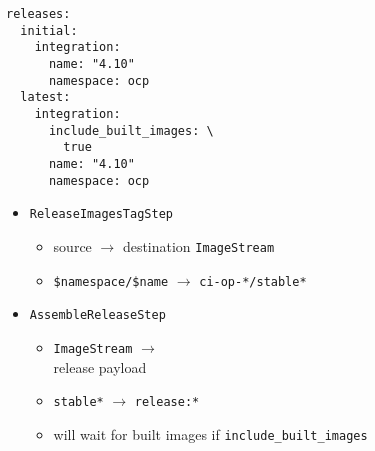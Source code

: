 \begin{frame}[fragile]
    \autotitle
    \setlength{\columnsep}{0pt}
    \begin{multicols}{2}
        \vspace*{\fill}
        \footnotesize
        \begin{verbatim}
releases:
  initial:
    integration:
      name: "4.10"
      namespace: ocp
  latest:
    integration:
      include_built_images: \
        true
      name: "4.10"
      namespace: ocp
        \end{verbatim}
        \vfill
        \columnbreak
        \normalsize
        \begin{itemize}
            \item \texttt{ReleaseImagesTagStep}
                \begin{itemize}
                    \item source $\to$ destination \texttt{ImageStream}
                    \item
                        \texttt{\$namespace/\$name} $\to$
                        \texttt{ci-op-*/stable*}
                \end{itemize}
            \item \texttt{AssembleReleaseStep}
                \begin{itemize}
                    \item
                        \texttt{ImageStream} $\to$ \\
                        release payload
                    \item \texttt{stable*} $\to$ \texttt{release:*}
                    \item
                        will wait for built images if
                        \texttt{include\_built\_images}
                \end{itemize}
        \end{itemize}
    \end{multicols}
\end{frame}
